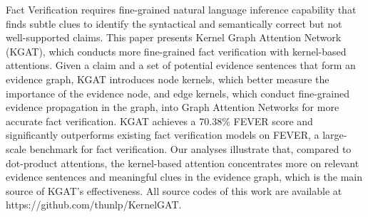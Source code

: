 Fact Verification requires fine-grained natural language inference capability that finds subtle clues to identify the syntactical and semantically correct but not well-supported claims. This paper presents Kernel Graph Attention Network (KGAT), which conducts more fine-grained fact verification with kernel-based attentions. Given a claim and a set of potential evidence sentences that form an evidence graph, KGAT introduces node kernels, which better measure the importance of the evidence node, and edge kernels, which conduct fine-grained evidence propagation in the graph, into Graph Attention Networks for more accurate fact verification. KGAT achieves a 70.38\% FEVER score and significantly outperforms existing fact verification models on FEVER, a large-scale benchmark for fact verification. Our analyses illustrate that, compared to dot-product attentions, the kernel-based attention concentrates more on relevant evidence sentences and meaningful clues in the evidence graph, which is the main source of KGAT's effectiveness. All source codes of this work are available at https://github.com/thunlp/KernelGAT.
